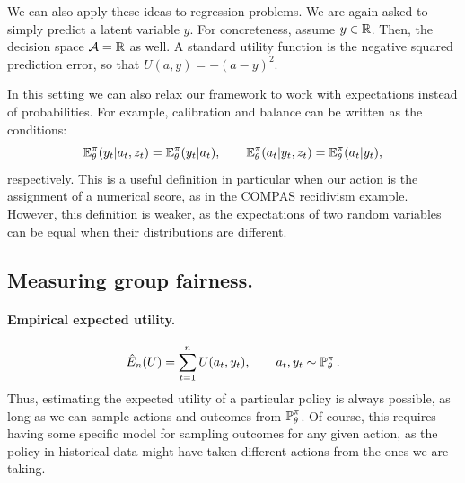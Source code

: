 \begin{example}[Regression]
  We can also apply these ideas to regression problems. We are again
  asked to simply predict a latent variable $y$. For concreteness,
  assume $y \in {\mathbb{R}}$. Then, the decision space ${\mathcal{A}} = {\mathbb{R}}$ as
  well. A standard utility function is the negative squared prediction
  error, so that $U(a, y) = - (a - y)^2$.

  In this setting we can also relax our framework to work with
  expectations instead of probabilities. For example, calibration and balance can be written as the conditions:
  \[
    \mathop{\mbox{\ensuremath{\mathbb{E}}}}\nolimits_\theta^\pi(y_t | a_t, z_t) = \mathop{\mbox{\ensuremath{\mathbb{E}}}}\nolimits_\theta^\pi(y_t | a_t),
    \qquad
    \mathop{\mbox{\ensuremath{\mathbb{E}}}}\nolimits_\theta^\pi(a_t | y_t, z_t) = \mathop{\mbox{\ensuremath{\mathbb{E}}}}\nolimits_\theta^\pi(a_t | y_t),
  \]
  respectively. This is a useful definition in particular when our
  action is the assignment of a numerical score, as in the COMPAS
  recidivism example. However, this definition is weaker, as the
  expectations of two random variables can be equal when their
  distributions are different.
\end{example}

\subsection{Measuring group fairness.}



\paragraph{Empirical expected utility.}
\[
  \hat{E}_n(U) = \sum_{t=1}^n U(a_t,y_t), \qquad a_t, y_t \sim \mathop{\mbox{\ensuremath{\mathbb{P}}}}\nolimits_\theta^\pi.
\]
Thus, estimating the expected utility of a particular policy is always possible, as long as we can sample actions and outcomes from $\mathop{\mbox{\ensuremath{\mathbb{P}}}}\nolimits_\theta^\pi$. Of course, this requires having some specific model for sampling outcomes for any given action, as the policy in historical data might have taken different actions from the ones we are taking.

